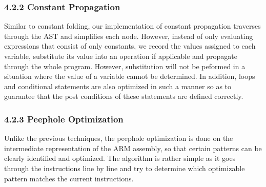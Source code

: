 \documentclass[10pt,a4paper]{report}
\begin{document}
  \subsubsection*{4.2.2	Constant Propagation}
  Similar to constant folding, our implementation of constant propagation traverses through the AST and simplifies each node. However, instead of 
  only evaluating expressions that consist of only constants, we record the values assigned to each variable, substitute its value into
  an operation if applicable and propagate through the whole program. However, substitution will not be peformed in a situation where the value of 
  a variable cannot be determined. In addition, loops and conditional statements are also optimized in such a manner so as to guarantee that the 
  post conditions of these statements are defined correctly.
  \subsubsection*{4.2.3	Peephole Optimization}
  Unlike the previous techniques, the peephole optimization is done on the intermediate representation of the ARM assembly, so that certain patterns
  can be clearly identified and optimized. The algorithm is rather simple as it goes through the instructions line by line and try to determine which 
  optimizable pattern matches the current instructions.
\end{document}
